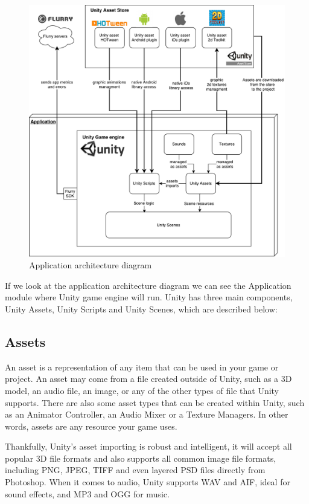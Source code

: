 \begin{figure}[ht!]
	\centering
	\includegraphics[width=400pt]{graphics/architecture/Application_architecture.pdf}
	\caption{Application architecture diagram}
	\label{fig:applicationarchitecture}
\end{figure}

If we look at the application architecture diagram we can see the Application module where Unity game engine will run. Unity has three main components, Unity Assets, Unity Scripts and Unity Scenes, which are described below:

\subsection{Assets}
An asset is a representation of any item that can be used in your game or project. An asset may come from a file created outside of Unity, such as a 3D model, an audio file, an image, or any of the other types of file that Unity supports. There are also some asset types that can be created within Unity, such as an Animator Controller, an Audio Mixer or a Texture Managers. In other words, assets are any resource your game uses.

Thankfully, Unity’s asset importing is robust and intelligent, it will accept all popular 3D file formats and also supports all common image file formats, including PNG, JPEG, TIFF and even layered PSD files directly from Photoshop. When it comes to audio, Unity supports WAV and AIF, ideal for sound effects, and MP3 and OGG for music.

